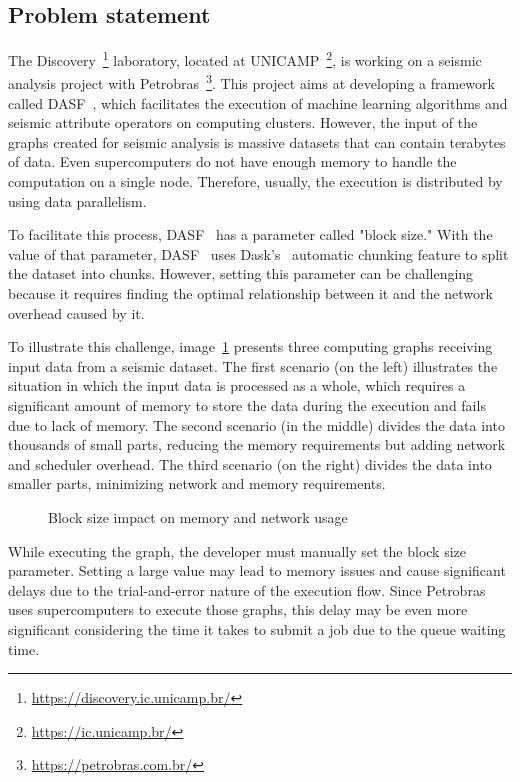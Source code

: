 \subsection{Problem statement}
\label{subsec:problem-statement}

The Discovery~\footnote{\url{https://discovery.ic.unicamp.br/}} laboratory, located at \ac{UNICAMP}~\footnote{\url{https://ic.unicamp.br/}}, is working on a seismic analysis project with Petrobras~\footnote{\url{https://petrobras.com.br/}}.
This project aims at developing a framework called \ac{DASF}~\cite{dasf}, which facilitates the execution of machine learning algorithms and seismic attribute operators on computing clusters.
However, the input of the graphs created for seismic analysis is massive datasets that can contain terabytes of data.
Even supercomputers do not have enough memory to handle the computation on a single node.
Therefore, usually, the execution is distributed by using data parallelism.

To facilitate this process, \ac{DASF}~\cite{dasf} has a parameter called "block size."
With the value of that parameter, \ac{DASF}~\cite{dasf} uses Dask's~\cite{dask} automatic chunking feature to split the dataset into chunks.
However, setting this parameter can be challenging because it requires finding the optimal relationship between it and the network overhead caused by it.

To illustrate this challenge, image~\ref{fig:block-size} presents three computing graphs receiving input data from a seismic dataset.
The first scenario (on the left) illustrates the situation in which the input data is processed as a whole, which requires a significant amount of memory to store the data during the execution and fails due to lack of memory.
The second scenario (in the middle) divides the data into thousands of small parts, reducing the memory requirements but adding network and scheduler overhead.
The third scenario (on the right) divides the data into smaller parts, minimizing network and memory requirements.

\begin{figure}[ht]
  \caption{Block size impact on memory and network usage}
  \label{fig:block-size}
\end{figure}

While executing the graph, the developer must manually set the block size parameter.
Setting a large value may lead to memory issues and cause significant delays due to the trial-and-error nature of the execution flow.
Since Petrobras uses supercomputers to execute those graphs, this delay may be even more significant considering the time it takes to submit a job due to the queue waiting time.

